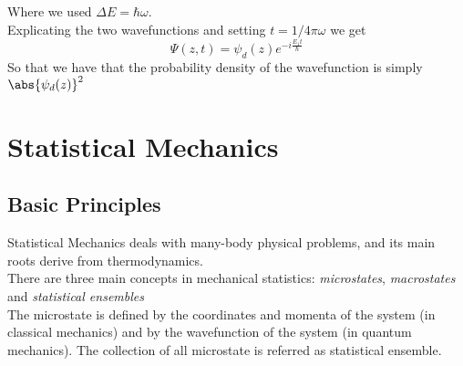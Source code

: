 \documentclass[a4paper, 11pt]{book}
\newcommand{\1}{\opr{\mathds{1}}}
\theoremstyle{plain}
\begin{document}
	Where we used $\Delta E=\hbar\omega$.\\
	Explicating the two wavefunctions and setting $t=1/4\pi\omega$ we get
	\begin{equation}
		\Psi(z,t)=\psi_d(z)e^{-i\frac{E_1t}{\hbar}}
		\label{eq:halfnutimenh3}
	\end{equation}
	So that we have that the probability density of the wavefunction is simply $\abs{\psi_d(z)}^2$
	\part{Statistical Mechanics}
	\chapter{Basic Principles}
	Statistical Mechanics deals with many-body physical problems, and its main roots derive from thermodynamics.\\
	There are three main concepts in mechanical statistics: \textit{microstates}, \textit{macrostates} and \textit{statistical ensembles}\\
	The microstate is defined by the coordinates and momenta of the system (in classical mechanics) and by the wavefunction of the system (in quantum mechanics). The collection of all microstate is referred as statistical ensemble.
\end{document}
